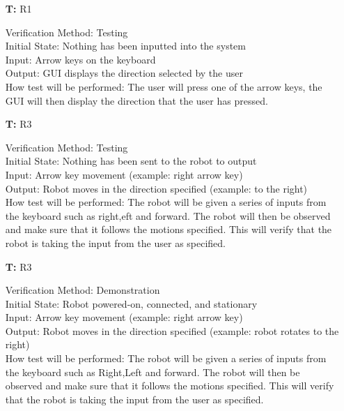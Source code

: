 \documentclass[12pt, titlepage]{article}
\newcounter{tnum} %
\begin{document}
\noindent \begin{itemize}
\item[\textbf{T\refstepcounter{tnum}\thetnum:}]{R1\\}

Verification Method: Testing	\\	
Initial State: Nothing has been inputted into the system\\
Input: Arrow keys on the keyboard \\ 
Output: GUI displays the direction selected by the user \\ 
How test will be performed: The user will press one of the arrow keys, the GUI will then display the direction that the user has pressed.\\

\item[\textbf{T\refstepcounter{tnum}\thetnum:}]{R3\\}

Verification Method: Testing	\\	
Initial State: Nothing has been sent to the robot to output \\
Input: Arrow key movement (example: right arrow key) \\ 
Output: Robot moves in the direction specified (example: to the right) \\ 
How test will be performed: The robot will be given a series of inputs from the keyboard such as right,eft and forward. The robot will then be observed and make sure that it follows the motions specified. This will verify that the robot is taking the input from the user as specified. \\
	
\item[\textbf{T\refstepcounter{tnum}\thetnum:}]{R3\\}
 
Verification Method: Demonstration\\
Initial State: Robot powered-on, connected, and stationary \\
Input: Arrow key movement (example: right arrow key) \\ 
Output: Robot moves in the direction specified (example: robot rotates to the right) \\ 
How test will be performed: The robot will be given a series of inputs from the keyboard such as Right,Left and forward. The robot will then be observed and make sure that it follows the motions specified. This will verify that the robot is taking the input from the user as specified. \\


\end{itemize}
\end{document}
